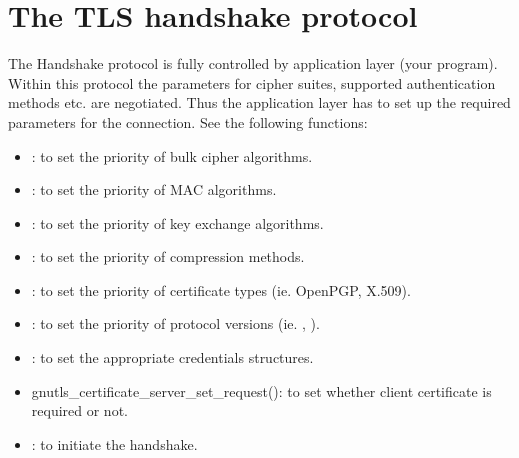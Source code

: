 \section{The TLS handshake protocol}

The Handshake protocol is fully controlled by application layer (your 
program). Within this protocol the parameters for cipher suites, supported
authentication methods etc. are negotiated. Thus the application layer
has to set up the required parameters for the connection.
See the following functions:
\begin{itemize}
\item {}:
to set the priority of bulk cipher algorithms.
\item {}:
to set the priority of MAC algorithms.
\item {}:
to set the priority of key exchange algorithms.
\item {}:
to set the priority of compression methods.
\item {}:
to set the priority of certificate types (ie. OpenPGP, X.509).
\item {}:
to set the priority of protocol versions (ie. \sslIII{}, \tlsI).
\item {}: to set the
appropriate credentials structures.
\item {}
{gnutls\_certificate\_server\_set\_request()}: to set
whether client certificate is required or not.
\item {}: to initiate the
handshake.
\end{itemize}



